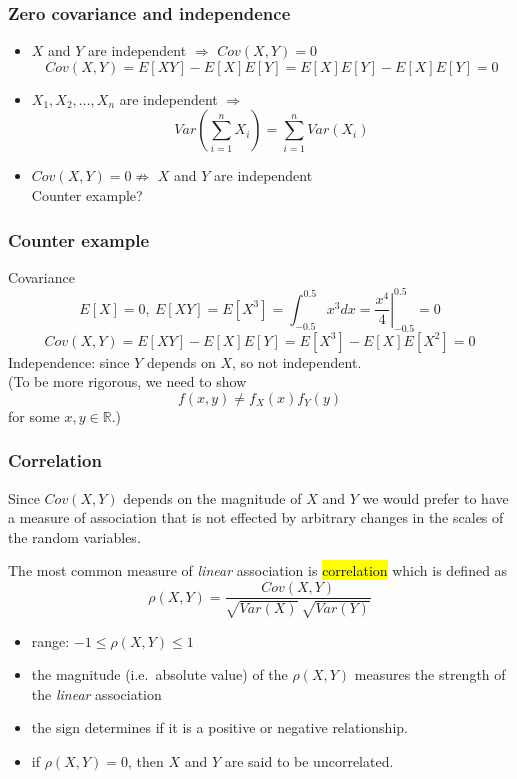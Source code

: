 \documentclass[slidestop,compress,mathserif]{beamer}
\begin{document}
\begin{frame}\frametitle{Zero covariance and independence}

\begin{itemize}
\item $X$ and $Y$ are independent $ \Longrightarrow$ $Cov(X,Y) = 0$
\pause
\[ Cov(X,Y) = E[XY]- E[X]E[Y] = E[X]E[Y] - E[X]E[Y] = 0\] \pause
\item $X_1, X_2, \ldots, X_n$ are independent $ \Longrightarrow$
\[Var\left(\sum_{i=1}^n X_i \right) = \sum_{i=1}^n Var(X_i)\]
\pause
\item $Cov(X,Y) = 0 \not\Longrightarrow$  $X$ and $Y$ are independent\\
Counter example?

\end{itemize}

\end{frame}

\begin{frame}\frametitle{Counter example}
\pause
Covariance \pause
\[E[X] = 0, ~ E[XY] = E[X^3] = \int_{-0.5}^{0.5} x^3 dx = \left. \frac{x^4}{4} \right|_{-0.5}^{0.5} = 0\] \pause
\[Cov(X, Y) = E[XY] - E[X] E[Y] = E[X^3] - E[X] E[X^2] = 0 \] \pause
Independence: \pause
since $Y$ depends on $X$, so not independent. \\ \pause
(To be more rigorous, we need to show \[f(x, y) \neq f_X(x)f_Y(y)\] for some $x, y \in \mathbb{R}$.)


\end{frame}

\begin{frame}
\frametitle{Correlation}

Since $Cov(X,Y)$ depends on the magnitude of $X$ and $Y$ we would prefer to have a measure of association that is not effected by arbitrary changes in the scales of the random variables.\\

\begin{defn}
The most common measure of \emph{linear} association is \hl{correlation} which is defined as
\[ \rho(X,Y) = \frac{Cov(X,Y)}{\sqrt{Var(X)}~\sqrt{Var(Y)}}  \]
\end{defn}
\pause
\begin{itemize}
\item range: $-1 \leq \rho(X,Y) \leq 1 $
\item the magnitude (i.e.\ absolute value) of the $\rho(X,Y)$ measures the strength of the \emph{linear} association
\item the sign determines if it is a positive or negative relationship.
\item if $\rho(X, Y) = 0$, then $X$ and $Y$ are said to be uncorrelated.
\end{itemize}
\end{frame}
\end{document}
